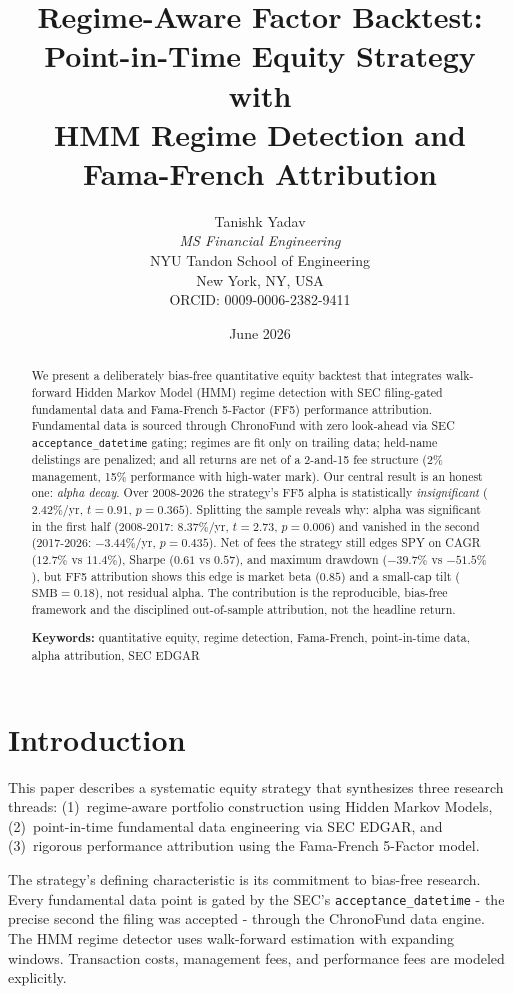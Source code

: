 \documentclass[11pt]{article}
\title{\textbf{Regime-Aware Factor Backtest:\\Point-in-Time Equity Strategy with\\HMM Regime Detection and Fama-French Attribution}}
\author{Tanishk Yadav\\[2pt]\textit{MS Financial Engineering}\\NYU Tandon School of Engineering\\New York, NY, USA\\[2pt]ORCID: 0009-0006-2382-9411}
\date{June 2026}
\begin{document}
\maketitle
\thispagestyle{fancy}

\begin{abstract}
\noindent
We present a deliberately bias-free quantitative equity backtest that integrates
walk-forward Hidden Markov Model (HMM) regime detection with SEC filing-gated
fundamental data and Fama-French 5-Factor (FF5) performance attribution. Fundamental
data is sourced through ChronoFund with zero look-ahead via SEC
\texttt{acceptance\_datetime} gating; regimes are fit only on trailing data; held-name
delistings are penalized; and all returns are net of a 2-and-15 fee structure (2\%
management, 15\% performance with high-water mark). Our central result is an honest
one: \emph{alpha decay}. Over 2008-2026 the strategy's FF5 alpha is statistically
\emph{insignificant} ($2.42\%$/yr, $t = 0.91$, $p = 0.365$). Splitting the sample
reveals why: alpha was significant in the first half (2008-2017: $8.37\%$/yr,
$t = 2.73$, $p = 0.006$) and vanished in the second (2017-2026: $-3.44\%$/yr,
$p = 0.435$). Net of fees the strategy still edges SPY on CAGR ($12.7\%$ vs $11.4\%$),
Sharpe ($0.61$ vs $0.57$), and maximum drawdown ($-39.7\%$ vs $-51.5\%$), but FF5
attribution shows this edge is market beta ($0.85$) and a small-cap tilt
($\text{SMB} = 0.18$), not residual alpha. The contribution is the reproducible,
bias-free framework and the disciplined out-of-sample attribution, not the headline
return.

\medskip
\noindent\textbf{Keywords:} quantitative equity, regime detection, Fama-French, point-in-time data, alpha attribution, SEC EDGAR
\end{abstract}

\section{Introduction}

This paper describes a systematic equity strategy that synthesizes three research threads: (1)~regime-aware portfolio construction using Hidden Markov Models, (2)~point-in-time fundamental data engineering via SEC EDGAR, and (3)~rigorous performance attribution using the Fama-French 5-Factor model.

The strategy's defining characteristic is its commitment to bias-free research. Every fundamental data point is gated by the SEC's \texttt{acceptance\_datetime} - the precise second the filing was accepted - through the ChronoFund data engine. The HMM regime detector uses walk-forward estimation with expanding windows. Transaction costs, management fees, and performance fees are modeled explicitly.
\end{document}
